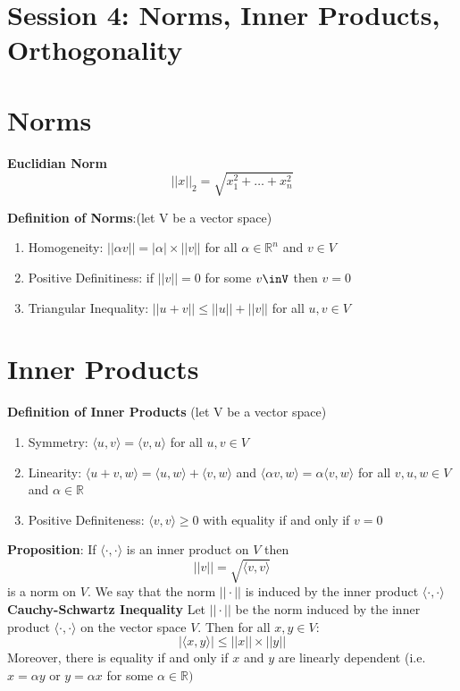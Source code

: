 \documentclass[12pt,twoside]{article}
\newcommand{\R}{\mathbb{R}}
\begin{document}
\section*{Session 4: Norms, Inner Products, Orthogonality}

\section{Norms}
\textbf{Euclidian Norm}\\
$$
    ||x||_2 = \sqrt{x_1^2 + \dots + x_n^2}
$$

\textbf{Definition of Norms}:(let V be a vector space)
\begin{enumerate}
    \item Homogeneity: $||\alpha v|| = |\alpha| \times ||v||$ for all $\alpha \in \R^n$ and $v \in V$
    \item Positive Definitiness: if $||v|| = 0$ for some $v\inV$ then $v=0$
    \item Triangular Inequality: $||u+v|| \leq ||u|| + ||v|| $ for all $u,v \in V$
\end{enumerate}

\section{Inner Products} 
\textbf{Definition of Inner Products} (let V be a vector space)
\begin{enumerate}
    \item Symmetry: $\langle u, v \rangle = \langle v, u \rangle$ for all $u,v \in V$
    \item Linearity: $\langle u+v, w \rangle = \langle u,w\rangle + \langle v,w\rangle$ and $\langle \alpha v , w\rangle = \alpha \langle v,w\rangle$ for all $v,u,w \in V$ and $\alpha \in \R$
    \item Positive Definiteness: $\langle v,v \rangle \geq 0$ with equality if and only if $v=0$
\end{enumerate}
\textbf{Proposition}:
If $\langle \cdot,\cdot \rangle $ is an inner product on $V$ then $$
    ||v|| = \sqrt{\langle v,v \rangle}
$$ is a norm on $V$. We say that the norm $||\cdot|| $ is induced by the inner product $\langle \cdot, \cdot \rangle$ \\

\textbf{Cauchy-Schwartz Inequality}
Let $||\cdot||$ be the norm induced by the inner product $\langle \cdot, \cdot \rangle$ on the vector space $V$. Then for all $x,y \in V$:
$$
    |\langle x,y \rangle|  \leq ||x|| \times ||y||
    $$
Moreover, there is equality if and only if $x$ and $y$ are linearly dependent (i.e. $x=\alpha y$ or $y= \alpha x$ for some $\alpha \in \R)$
\end{document}
